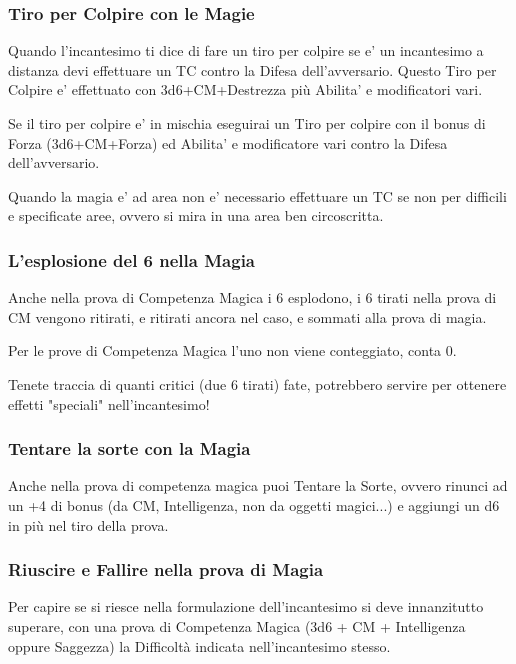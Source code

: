 \subsubsection{Tiro per Colpire con le Magie}

Quando l'incantesimo ti dice di fare un tiro per colpire se e' un incantesimo a distanza devi effettuare un TC contro la Difesa dell'avversario. Questo Tiro per Colpire e' effettuato con 3d6+CM+Destrezza più Abilita' e modificatori vari.

Se il tiro per colpire e' in mischia eseguirai un Tiro per colpire con il bonus di Forza (3d6+CM+Forza) ed Abilita' e modificatore vari contro la Difesa dell'avversario.

Quando la magia e' ad area non e' necessario effettuare un TC se non per difficili e specificate aree, ovvero si mira in una area ben circoscritta.

\subsubsection{L'esplosione del 6 nella Magia}

Anche nella prova di Competenza Magica i 6 esplodono, i 6 tirati nella prova di CM vengono ritirati, e ritirati ancora nel caso, e sommati alla prova di magia.

Per le prove di Competenza Magica l'uno non viene conteggiato, conta 0.

Tenete traccia di quanti critici (due 6 tirati) fate, potrebbero servire per ottenere effetti "speciali" nell'incantesimo!

\subsubsection{Tentare la sorte con la Magia}

Anche nella prova di competenza magica puoi Tentare la Sorte, ovvero rinunci ad un +4 di bonus (da CM, Intelligenza, non da oggetti magici...) e aggiungi un d6 in più nel tiro della prova.

\subsubsection{Riuscire e Fallire nella prova di Magia}

Per capire se si riesce nella formulazione dell'incantesimo si deve innanzitutto superare, con una prova di Competenza Magica (3d6 + CM + Intelligenza oppure Saggezza) la Difficoltà indicata nell'incantesimo stesso.

